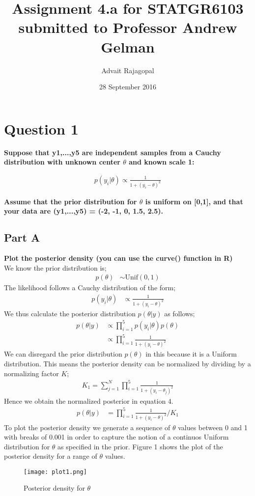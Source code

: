 \documentclass{article}
\title{Assignment 4.a for \textbf{STATGR6103}\\
\large submitted to Professor Andrew Gelman}
\date{28 September 2016}
\author{Advait Rajagopal}
\begin{document}
  \maketitle
  
 \section{Question 1}
\textbf{Suppose that y1,...,y5 are independent samples from a Cauchy distribution with unknown center $\theta$ and known scale 1: }

\begin{align*}
\displaystyle
p(y_i  | \theta) \propto \frac{1}{1 + (y_i - \theta)^2}
\end{align*}

\textbf{Assume that the prior distribution for $\theta$ is uniform on [0,1], and that your data are (y1,...,y5) = (-2, -1, 0, 1.5, 2.5).}
\subsection{Part A}
\textbf{Plot the posterior density (you can use the curve() function in R)}\\
We know the prior distribution is;
\begin{align}
p(\theta) & \sim \text{Unif}(0, 1)
\end{align}
The likelihood follows a Cauchy distribution of the form;
\begin{align}
\displaystyle
p(y_i  | \theta) & \propto \frac{1}{1 + (y_i - \theta)^2}
\end{align}
We thus calculate the posterior distribution $p(\theta|y)$ as follows;
\begin{align*}
\displaystyle
p(\theta | y) & \propto \prod_{i=1}^{5} p(y_i | \theta) p(\theta)
\\ 
& \propto \prod_{i=1}^{5} \frac{1}{1 + (y_i - \theta)^2}
\end{align*}
We can disregard the prior distribution $p(\theta)$ in this because it is a Uniform distribution. This means the posterior density can be normalized by dividing by a normalizing factor $K$;
\begin{align}
\displaystyle
K_1 = \sum_{j=1}^{N}  \prod_{i=1}^{5} \frac{1}{1 + (y_i - \theta_j)^2}
\end{align}
Hence we obtain the normalized posterior in equation 4.
\begin{align}
p(\theta | y)  &= \prod_{i=1}^{5} \frac{1}{1 + (y_i - \theta)^2} / K_1
\end{align}
\newpage
To plot the posterior density we generate a sequence of $\theta$ values between 0 and 1 with breaks of 0.001 in order to capture the notion of a continuos Uniform distribution for $\theta$ as specified in the prior.
Figure 1 shows the plot of the posterior density for a range of $\theta$ values.
 \begin{figure}[H]
\centering
\texttt{[image: plot1.png]}
\caption{Posterior density for $\theta$}
\label{deltat}
\end{figure}
\end{document}
